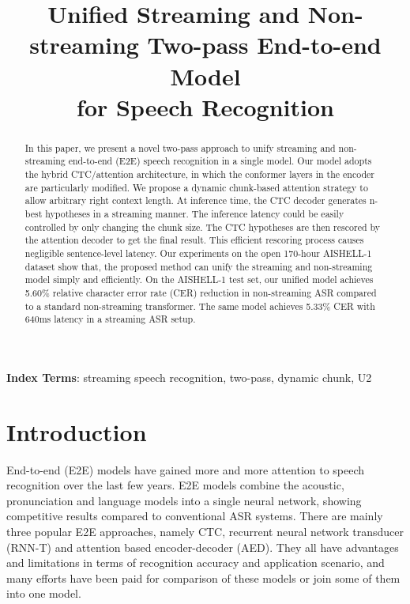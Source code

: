 \documentclass[a4paper]{article}
\title{Unified Streaming and Non-streaming Two-pass End-to-end Model \\
for Speech Recognition}
\begin{document}
\maketitle
\begin{abstract}
In this paper, we present a novel two-pass approach to unify streaming and non-streaming end-to-end (E2E) speech recognition in a single model. 
Our model adopts the hybrid CTC/attention architecture, in which the conformer layers in the encoder are particularly modified. We propose a dynamic chunk-based attention strategy to allow arbitrary right context length. At inference time, the CTC decoder generates n-best hypotheses in a streaming manner. The inference latency could be easily controlled by only changing the chunk size. The CTC hypotheses are then rescored by the attention decoder to get the final result. This efficient rescoring process causes negligible sentence-level latency. Our experiments on the open 170-hour AISHELL-1 dataset show that, the proposed method can unify the streaming and non-streaming model simply and efficiently. On the AISHELL-1 test set, our unified model achieves 5.60\% relative character error rate (CER) reduction in non-streaming ASR compared to a standard non-streaming transformer. The same model achieves 5.33\% CER with 640ms latency in a streaming ASR setup.


\end{abstract}
\noindent\textbf{Index Terms}: streaming speech recognition, two-pass, dynamic chunk, U2

\section{Introduction}

End-to-end (E2E) models have gained more and more attention to speech recognition over the last few years.
E2E models combine the acoustic, pronunciation and language models into a single neural network, showing competitive results compared to conventional ASR systems.
There are mainly three popular E2E approaches, namely CTC\cite{graves2006connectionist,amodei2016deep}, recurrent neural network transducer (RNN-T)\cite{graves2012sequence,graves2013speech} and attention based encoder-decoder (AED)\cite{chorowski2014end,chan2015listen,chorowski2015attention}.
They all have advantages and limitations in terms of recognition accuracy and application scenario, and many efforts have been paid for comparison of these models\cite{prabhavalkar2017comparison} or join some of them into one model\cite{kim2017joint,sainath2019two}.
\end{document}
